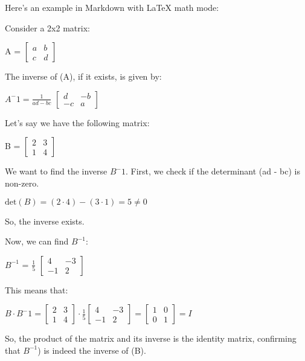 \documentclass[11pt]{article}
\makeatletter
\newcommand{\boxspacing}{\kern\kvtcb@left@rule\kern\kvtcb@boxsep}
\newcommand{\prompt}[4]{
        {\ttfamily\llap{{\color{#2}[#3]:\hspace{3pt}#4}}\vspace{-\baselineskip}}
    }
\makeatother
\begin{document}
Here's an example in Markdown with LaTeX math mode:

Consider a 2x2 matrix:

A = \(\begin{bmatrix} a & b \\ c & d \end{bmatrix}\)

The inverse of (A), if it exists, is given by:

$A^-1 = \frac{1}{ad - bc}$
$\begin{bmatrix} d & -b \\ -c & a \end{bmatrix}$

Let's say we have the following matrix:

B = $\begin{bmatrix} 2 & 3 \\ 1 & 4 \end{bmatrix}$

We want to find the inverse $B^-1$. First, we check if the
determinant (ad - bc) is non-zero.

$\text{det}(B) = (2 \cdot 4) - (3 \cdot 1) = 5 \neq 0$

So, the inverse exists.

Now, we can find \(B^{-1}\):

\(B^{-1}\) = \(\frac{1}{5}\)
\(\begin{bmatrix} 4 & -3 \\ -1 & 2 \end{bmatrix}\)

This means that:

$ B \cdot B^-1 = \begin{bmatrix} 2 & 3 \\ 1 & 4 \end{bmatrix}
\cdot \frac{1}{5} \begin{bmatrix} 4 & -3 \\ -1 & 2 \end{bmatrix} =
\begin{bmatrix} 1 & 0 \\ 0 & 1 \end{bmatrix} = I $

So, the product of the matrix and its inverse is the identity matrix,
confirming that \(B^{-1}\)) is indeed the inverse of (B).

    \begin{tcolorbox}[breakable, size=fbox, boxrule=1pt, pad at break*=1mm,colback=cellbackground, colframe=cellborder]
\prompt{In}{incolor}{ }{\boxspacing}
\begin{Verbatim}[commandchars=\\\{\}]

\end{Verbatim}
\end{tcolorbox}
\end{document}
